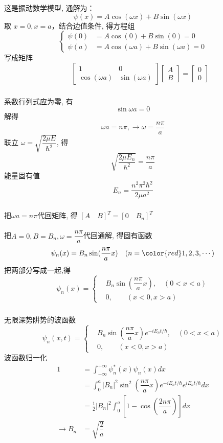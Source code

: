 \begin{frame}
	\frametitle{}
	这是振动数学模型, 通解为：
     	\begin{equation*}
  			\psi(x) = A\cos(\omega x) +B\sin(\omega x) 
    	\end{equation*}
取 $x=0, x=a$，结合边值条件, 得方程组
\[ \left\{
\begin{aligned}
	\psi(0) &= A\cos(0) +B\sin(0) = 0 \\ 
	\psi(a) &= A\cos(\omega a) +B\sin(\omega a) =0
\end{aligned} \right.	
\]
写成矩阵
$$\qquad \begin{bmatrix}
	1 & 0 \\ 
	\cos(\omega a) & \sin(\omega a)
\end{bmatrix} 
\begin{bmatrix}
	A\\ 
	B
\end{bmatrix}  =
\begin{bmatrix}
	0\\ 
	0
\end{bmatrix} $$
\end{frame}

\begin{frame}
	\frametitle{}
	系数行列式应为零, 有
$$\sin \omega a =0$$
解得 
\[\omega a = n\pi, \to \omega =\frac{n\pi}{a} \]
联立 $ \omega = \sqrt{\dfrac{2\mu E}{\hbar ^2}} $, 得  
\[\sqrt{\dfrac{2\mu E_n}{\hbar ^2}}  =  \frac{n\pi}{a}\]
能量固有值
\[E_n = \dfrac{n^2\pi^2\hbar^2}{2\mu a^2} \]
\end{frame}

\begin{frame} 
	\frametitle{}
把$\omega a = n\pi$代回矩阵, 得 $[A \quad B]^T =[0 \quad B_n]^T$ \\
~~\\ 
把$A=0, B=B_n, \omega = \dfrac{n\pi}{a} $代回通解, 得固有函数
\[\psi _n (x) = B_n\sin(\dfrac{n\pi}{a}x) \quad (n={\color{red}1},2,3,\cdots ) \]
把两部分写成一起,得
\[ \psi_n(x)=\left\{
\begin{aligned}
	& B_n\sin(\dfrac{n\pi}{a}x), \quad (0 < x < a) \\ 
	& 0, \quad \quad ( x < 0, x > a)
\end{aligned} \right.
\]
\end{frame}

\begin{frame} 
	\frametitle{}
无限深势阱势的波函数
\[ \psi _n (x,t)=\left\{
\begin{aligned}
	& B_n \sin(\dfrac{n\pi}{a}x) e^{-iE_nt/\hbar}, \quad (0 < x < a) \\ 
	& 0, \quad \quad ( x < 0, x > a)
\end{aligned} \right.
\]
波函数归一化
\[ 
\begin{aligned}
	1 & = \int_{-\infty}^{+\infty}\psi_n ^* (x) \psi_n (x) dx\\ 
	& = \int_{0}^{a}|B_n|^2\sin^2 (\dfrac{n\pi}{a}x)e^{-iE_nt/\hbar} e^{iE_nt/\hbar}dx\\
	& = \frac{1}{2}|B_n|^2\int_{0}^{a}\left[1-\cos(\dfrac{2n\pi}{a})\right]dx\\
	\to B_n & =\sqrt{\dfrac{2}{a}}
\end{aligned}
\]	
\end{frame}

